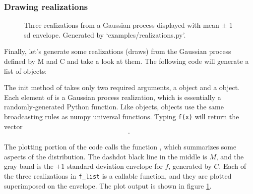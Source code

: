 \subsubsection{Drawing realizations}\label{subsub:realizations}
\begin{figure}
    \centering
    \caption{Three realizations from a Gaussian process displayed with mean $\pm$ 1 sd envelope. Generated by {\sffamily `examples/realizations.py'}.}
    \label{fig:realizations}
\end{figure}

Finally, let's generate some realizations (draws) from the Gaussian process defined by M and C and take a look at them. The following code will generate a list of  objects:


    The init method of  takes only two required arguments, a  object and a  object. Each element of  is a Gaussian process realization, which is essentially a randomly-generated Python function. Like  objects,  objects use the same broadcasting rules as numpy universal functions. Typing \texttt{f(x)} will return the vector
\begin{eqnarray*}
    [\texttt{f(x[0])}\ldots \texttt{f(x[N-1])}].
\end{eqnarray*}


The plotting portion of the code calls the function , which summarizes some aspects of the distribution. The dashdot black line in the middle is $M$, and the gray band is the $\pm 1$ standard deviation envelope for $f$, generated by $C$. Each of the three realizations in \texttt{f_list} is a callable function, and they are plotted superimposed on the envelope. The plot output is shown in figure \ref{fig:realizations}.


